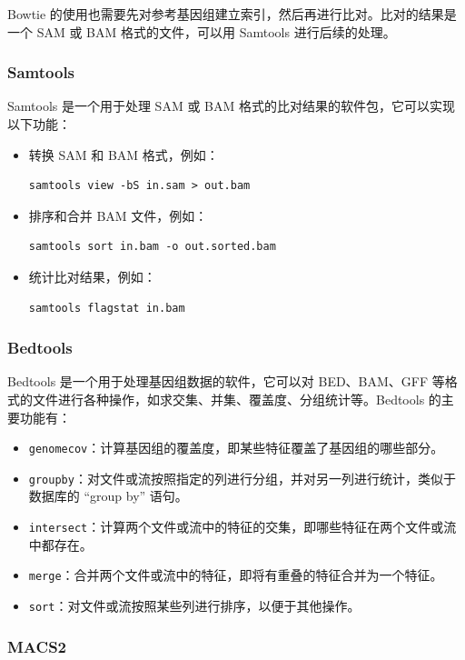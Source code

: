 \documentclass[UTF8]{ctexart}
\begin{document}
Bowtie 的使用也需要先对参考基因组建立索引，然后再进行比对。比对的结果是一个 SAM 或 BAM 格式的文件，可以用 Samtools 进行后续的处理。

\subsubsection{Samtools}

Samtools 是一个用于处理 SAM 或 BAM 格式的比对结果的软件包，它可以实现以下功能：

\begin{itemize}
\item 转换 SAM 和 BAM 格式，例如：
\begin{lstlisting}
samtools view -bS in.sam > out.bam
\end{lstlisting}
\item 排序和合并 BAM 文件，例如：
\begin{lstlisting}
samtools sort in.bam -o out.sorted.bam
\end{lstlisting}
\item 统计比对结果，例如：
\begin{lstlisting}
samtools flagstat in.bam
\end{lstlisting}
\end{itemize}

\subsubsection{Bedtools}

Bedtools 是一个用于处理基因组数据的软件，它可以对 BED、BAM、GFF 等格式的文件进行各种操作，如求交集、并集、覆盖度、分组统计等。Bedtools 的主要功能有：

\begin{itemize}
	\item \verb|genomecov|：计算基因组的覆盖度，即某些特征覆盖了基因组的哪些部分。
	\item \verb|groupby|：对文件或流按照指定的列进行分组，并对另一列进行统计，类似于数据库的 “group by” 语句。
	\item \verb|intersect|：计算两个文件或流中的特征的交集，即哪些特征在两个文件或流中都存在。
	\item \verb|merge|：合并两个文件或流中的特征，即将有重叠的特征合并为一个特征。
	\item \verb|sort|：对文件或流按照某些列进行排序，以便于其他操作。
\end{itemize}

\subsubsection{MACS2}
\end{document}
